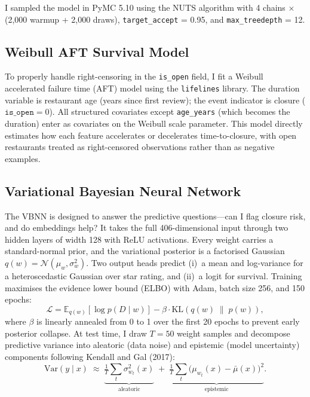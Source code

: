 \documentclass[10pt, letterpaper]{article}
\begin{document}
I sampled the model in PyMC 5.10 using the NUTS algorithm with 4 chains $\times$ (2,000 warmup + 2,000 draws), \texttt{target\_accept} = 0.95, and \texttt{max\_treedepth} = 12.

\subsection{Weibull AFT Survival Model}

To properly handle right-censoring in the \texttt{is\_open} field, I fit a Weibull accelerated failure time (AFT) model using the \texttt{lifelines} library. The duration variable is restaurant age (years since first review); the event indicator is closure ($\texttt{is\_open} = 0$). All structured covariates except \texttt{age\_years} (which becomes the duration) enter as covariates on the Weibull scale parameter. This model directly estimates how each feature accelerates or decelerates time-to-closure, with open restaurants treated as right-censored observations rather than as negative examples.

\subsection{Variational Bayesian Neural Network}

The VBNN is designed to answer the predictive questions---can I flag closure risk, and do embeddings help? It takes the full 406-dimensional input through two hidden layers of width 128 with ReLU activations. Every weight carries a standard-normal prior, and the variational posterior is a factorised Gaussian $q(w) = \mathcal{N}(\mu_w, \sigma_w^2)$. Two output heads predict (i)~a mean and log-variance for a heteroscedastic Gaussian over star rating, and (ii)~a logit for survival. Training maximises the evidence lower bound (ELBO) with Adam, batch size 256, and 150 epochs:
\[
\mathcal{L} = \mathbb{E}_{q(w)}\!\left[\log p(D \mid w)\right] - \beta \cdot \mathrm{KL}\!\left(q(w) \;\|\; p(w)\right),
\]
where $\beta$ is linearly annealed from 0 to 1 over the first 20 epochs to prevent early posterior collapse. At test time, I draw $T = 50$ weight samples and decompose predictive variance into aleatoric (data noise) and epistemic (model uncertainty) components following Kendall and Gal (2017):
\[
\mathrm{Var}(y \mid x) \;\approx\; \underbrace{\tfrac{1}{T}\sum_t \sigma^2_{w_t}(x)}_{\text{aleatoric}} \;+\; \underbrace{\tfrac{1}{T}\sum_t \bigl(\mu_{w_t}(x) - \bar{\mu}(x)\bigr)^2}_{\text{epistemic}}.
\]
\end{document}
